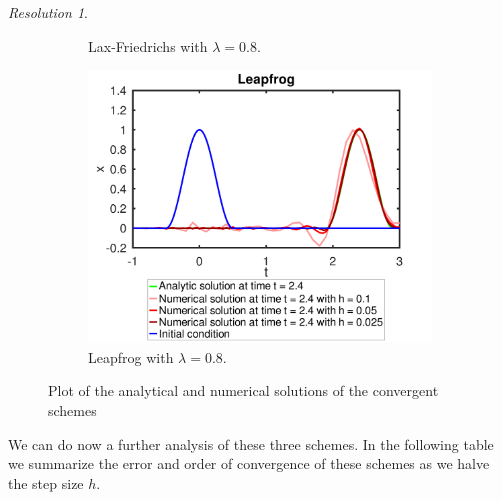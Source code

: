 \documentclass[10pt,a4paper]{article}
\theoremstyle{definition}
\theoremstyle{remark}
\newtheorem*{res}{Resolution}
\begin{document}
\begin{res}
\begin{figure}[ht]
\begin{subfigure}{0.49\textwidth}
      \caption{Lax-Friedrichs with $\lambda=0.8$.}
    \end{subfigure}\hfill
    \begin{subfigure}{0.49\textwidth}
      \centering
      \includegraphics[width=\textwidth]{Images/l.pdf}
      \caption{Leapfrog with $\lambda=0.8$.}
    \end{subfigure}
    \caption{Plot of the analytical and numerical solutions of the convergent schemes}
    \label{fig:convergent1}
  \end{figure}
  \newpage
  We can do now a further analysis of these three schemes. In the following table we summarize the error and order of convergence of these schemes as we halve the step size $h$.


\end{res}
\end{document}
